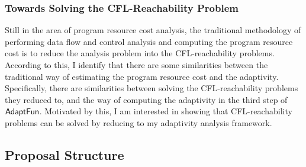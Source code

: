 \subsubsection{Towards Solving the CFL-Reachability Problem}
\label{subsec:intro-cfl}
Still in the area of program resource cost analysis,
the traditional methodology of performing data flow and control analysis and 
computing the program resource cost is
to reduce the analysis problem into the CFL-reachability problems.
According to this, 
I identify 
that there are some similarities between the traditional way of estimating the program resource cost and 
the adaptivity.
Specifically, there are similarities between solving the CFL-reachability problems they reduced to,
 and the way of computing the adaptivity in 
the third step of $\textsf{AdaptFun}$.
 Motivated by this, 
 I am interested in showing that
 CFL-reachability problems can be solved by reducing to my adaptivity analysis framework.


\subsection{Proposal Structure}
\label{subsec:intro-structure}

